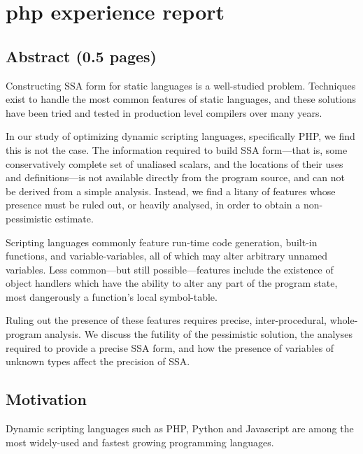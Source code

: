 \chapter{php experience report }

\providecommand{\phc}{PHC}
\providecommand{\php}[1]{\textsf{#1}}
\providecommand{\pbterm}[1]{\textsf{#1}}
\providecommand{\chref}[1]{Chapter~#1}
\providecommand{\secref}[1]{Chapter~#1}
\providecommand{\figref}[1]{Figure~#1}

\section{Abstract (0.5 pages)}

Constructing SSA form for static languages is a well-studied problem.
Techniques exist to handle the most common features of static languages, and these solutions have been tried and tested in production level compilers over many years.

In our study of optimizing dynamic scripting languages, specifically PHP, we find this is not the case.
The information required to build SSA form---that is, some conservatively complete set of unaliased scalars, and the locations of their uses and definitions---is not available directly from the program source, and can not be derived from a simple analysis.
Instead, we find a litany of features whose presence must be ruled out, or heavily analysed, in order to obtain a non-pessimistic estimate.

Scripting languages commonly feature run-time code generation, built-in functions, and variable-variables, all of which may alter arbitrary unnamed variables.
Less common---but still possible---features include the existence of object handlers which have the ability to alter any part of the program state, most dangerously a function's local symbol-table.

Ruling out the presence of these features requires precise, inter-procedural, whole-program analysis.
We discuss the futility of the pessimistic solution, the analyses required to provide a precise SSA form, and how the presence of variables of unknown types affect the precision of SSA.

\section{Motivation}

Dynamic scripting languages such as PHP, Python and Javascript are among the most widely-used and fastest growing programming languages.

